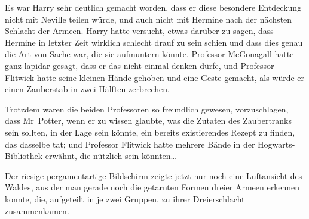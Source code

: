 Es war Harry sehr deutlich gemacht worden, dass er diese besondere Entdeckung nicht mit Neville teilen würde, und auch nicht mit Hermine nach der nächsten Schlacht der Armeen. Harry hatte versucht, etwas darüber zu sagen, dass Hermine in letzter Zeit wirklich schlecht drauf zu sein schien und dass dies genau die Art von Sache war, die sie aufmuntern könnte. Professor McGonagall hatte ganz lapidar gesagt, dass er das nicht einmal denken dürfe, und Professor Flitwick hatte seine kleinen Hände gehoben und eine Geste gemacht, als würde er einen Zauberstab in zwei Hälften zerbrechen.

Trotzdem waren die beiden Professoren so freundlich gewesen, vorzuschlagen, dass Mr~Potter, wenn er zu wissen glaubte, was die Zutaten des Zaubertranks sein sollten, in der Lage sein könnte, ein bereits existierendes Rezept zu finden, das dasselbe tat; und Professor Flitwick hatte mehrere Bände in der Hogwarts-Bibliothek erwähnt, die nützlich sein könnten…

\later

Der riesige pergamentartige Bildschirm zeigte jetzt nur noch eine Luftansicht des Waldes, aus der man gerade noch die getarnten Formen dreier Armeen erkennen konnte, die, aufgeteilt in je zwei Gruppen, zu ihrer Dreierschlacht zusammenkamen.

